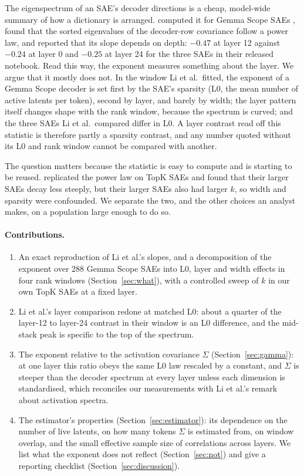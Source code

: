 \documentclass[10pt,twocolumn]{article}
\begin{document}
The eigenspectrum of an SAE's decoder directions is a cheap, model-wide summary of how a dictionary is arranged. \citet{li2025geometry} computed it for Gemma Scope SAEs \citep{lieberum2024gemmascope}, found that the sorted eigenvalues of the decoder-row covariance follow a power law, and reported that its slope depends on depth: $-0.47$ at layer 12 against $-0.24$ at layer 0 and $-0.25$ at layer 24 for the three SAEs in their released notebook. Read this way, the exponent measures something about the layer. We argue that it mostly does not. In the window Li et al.\ fitted, the exponent of a Gemma Scope decoder is set first by the SAE's sparsity (L0, the mean number of active latents per token), second by layer, and barely by width; the layer pattern itself changes shape with the rank window, because the spectrum is curved; and the three SAEs Li et al.\ compared differ in L0. A layer contrast read off this statistic is therefore partly a sparsity contrast, and any number quoted without its L0 and rank window cannot be compared with another.

The question matters because the statistic is easy to compute and is starting to be reused. \citet{peter2025progressive} replicated the power law on TopK SAEs and found that their larger SAEs decay less steeply, but their larger SAEs also had larger $k$, so width and sparsity were confounded. We separate the two, and the other choices an analyst makes, on a population large enough to do so.

\paragraph{Contributions.}
\begin{enumerate}
\setlength{\itemsep}{1pt}
\item An exact reproduction of Li et al.'s slopes, and a decomposition of the exponent over 288 Gemma Scope SAEs into L0, layer and width effects in four rank windows (Section~\ref{sec:what}), with a controlled sweep of $k$ in our own TopK SAEs at a fixed layer.
\item Li et al.'s layer comparison redone at matched L0: about a quarter of the layer-12 to layer-24 contrast in their window is an L0 difference, and the mid-stack peak is specific to the top of the spectrum.
\item The exponent relative to the activation covariance $\Sigma$ (Section~\ref{sec:gamma}): at one layer this ratio obeys the same L0 law rescaled by a constant, and $\Sigma$ is steeper than the decoder spectrum at every layer unless each dimension is standardised, which reconciles our measurements with Li et al.'s remark about activation spectra.
\item The estimator's properties (Section~\ref{sec:estimator}): its dependence on the number of live latents, on how many tokens $\Sigma$ is estimated from, on window overlap, and the small effective sample size of correlations across layers. We list what the exponent does not reflect (Section~\ref{sec:not}) and give a reporting checklist (Section~\ref{sec:discussion}).
\end{enumerate}
\end{document}
